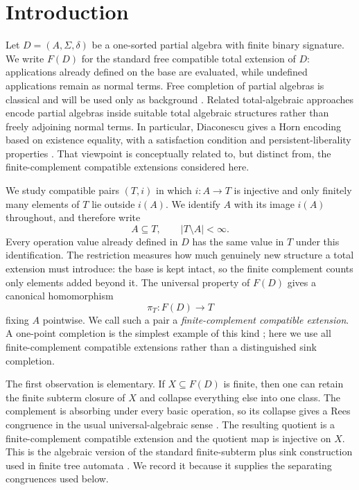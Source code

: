\section{Introduction}\label{sec:introduction}

Let $D=(A,\Sigma,\delta)$ be a one-sorted partial algebra with finite binary
signature.  We write $F(D)$ for the standard free compatible total extension of
$D$: applications already defined on the base are evaluated, while undefined
applications remain as normal terms.  Free completion of partial algebras is
classical and will be used only as background
\cite{ClimentVidalCosmeLlopez2023,Nesin2011}.
Related total-algebraic approaches encode partial algebras inside suitable total
algebraic structures rather than freely adjoining normal terms.  In particular,
Diaconescu gives a Horn encoding based on existence equality, with a satisfaction
condition and persistent-liberality properties \cite{Diaconescu2009}.  That
viewpoint is conceptually related to, but distinct from, the finite-complement
compatible extensions considered here.

We study compatible pairs $(T,i)$ in which $i:A\to T$ is injective and only
finitely many elements of $T$ lie outside $i(A)$.  We identify $A$ with its
image $i(A)$ throughout, and therefore write
\[
 A\subseteq T,
 \qquad |T\setminus A|<\infty.
\]
Every operation value already defined in $D$ has the same value in $T$ under
this identification.  The restriction measures how much genuinely new
structure a total extension must introduce: the base is kept intact, so the
finite complement counts only elements added beyond it.  The universal property
of $F(D)$ gives a canonical homomorphism
\[
 \pi_T:F(D)\longrightarrow T
\]
fixing $A$ pointwise.  We call such a pair a \emph{finite-complement compatible
extension}.  A one-point completion is the simplest example of this kind
\cite{Nesin2011}; here we use all finite-complement compatible extensions rather
than a distinguished sink completion.

The first observation is elementary.  If $X\subseteq F(D)$ is finite, then one
can retain the finite subterm closure of $X$ and collapse everything else into
one class.  The complement is absorbing under every basic operation, so its
collapse gives a Rees congruence in the usual universal-algebraic sense
\cite{Tichy1981}.  The resulting quotient is a finite-complement compatible
extension and the quotient map is injective on $X$.  This is the algebraic
version of the standard finite-subterm plus sink construction used in finite
tree automata \cite{ComonEtAl2008}.  We record it because it supplies the
separating congruences used below.

